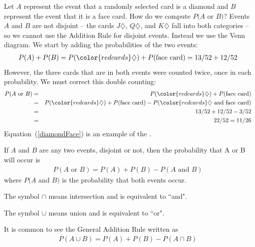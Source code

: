 Let $A$ represent the event that a randomly selected card is a diamond and $B$ represent the event that it is a face card. How do we compute $P(A$ or $B)$? Events $A$ and $B$ are not disjoint -- the cards {\color{redcards}$J\diamondsuit$}, {\color{redcards}$Q\diamondsuit$}, and {\color{redcards}$K\diamondsuit$} fall into both categories -- so we cannot use the Addition Rule for disjoint events. Instead we use the Venn diagram. We start by adding the probabilities of the two events:
\begin{eqnarray*}
P(A) + P(B) = P({\color{redcards}\diamondsuit}) + P(\text{face card}) = 13/52 + 12/52
\label{overCountFaceDiamond}
\end{eqnarray*}
However, the three cards that are in both events were counted twice, once in each probability. We must correct this double counting:
\begin{eqnarray}
P(A\text{ or } B) &=&P({\color{redcards}\diamondsuit}) + P(\text{face card})  \notag \\
 &=& P({\color{redcards}\diamondsuit}) + P(\text{face card}) - P({\color{redcards}\diamondsuit}  \text{ and face card}) \label{diamondFace} \\
 &=& 13/52 + 12/52 - 3/52 \notag \\
 &=& 22/52 = 11/26 \notag
\end{eqnarray}
Equation~(\ref{diamondFace}) is an example of the .

\begin{termBox}{ If $A$ and $B$ are any two events, disjoint or not, then the probability that A or B will occur is
\begin{eqnarray}
P(A\text{ or }B) = P(A) + P(B) - P(A\text{ and }B)
\label{generalAdditionRule}
\end{eqnarray}
where $P(A$ and $B)$ is the probability that both events occur.}
\end{termBox}


\begin{tipBox}{
The symbol $\cap$ means intersection and is equivalent to ``and".

The symbol  $\cup$ means union and is equivalent to ``or".

It is common to see the General Addition Rule written as
\begin{eqnarray}
P(A \cup B) = P(A) + P(B) - P(A \cap B)
\end{eqnarray}
}
\end{tipBox}

